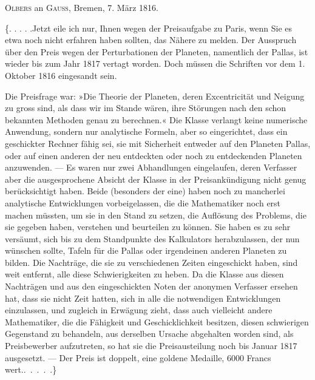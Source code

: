 \par{}\bigskip
\begin{center}
\textsc{Olbers} an \textsc{Gauss}, Bremen, 7. März 1816.
\end{center}
\noindent\hspace*{\parindent}\{. . . . .\quad Jetzt eile ich nur, Ihnen wegen der Preisaufgabe zu Paris, wenn Sie es etwa noch nicht erfahren haben sollten, das Nähere zu melden. Der Ausspruch über den Preis wegen der Perturbationen der Planeten, namentlich der Pallas, ist wieder bis zum Jahr 1817 vertagt worden. Doch müssen die Schriften vor dem 1. Oktober 1816 eingesandt sein.
\par Die Preisfrage war: »Die Theorie der Planeten, deren Excentricität und Neigung zu gross sind, als dass wir im Stande wären, ihre Störungen nach den schon bekannten Methoden genau zu berechnen.« Die Klasse verlangt keine numerische Anwendung, sondern nur analytische Formeln, aber so eingerichtet, dass ein geschickter Rechner fähig sei, sie mit Sicherheit entweder auf den Planeten Pallas, oder auf einen anderen der neu entdeckten oder noch zu entdeckenden Planeten anzuwenden. — Es waren nur zwei Abhandlungen eingelaufen, deren Verfasser aber die ausgesprochene Absicht der Klasse in der Preisankündigung nicht genug berücksichtigt haben. Beide (besonders der eine) haben noch zu mancherlei analytische Entwicklungen vorbeigelassen, die die Mathematiker noch erst machen müssten, um sie in den Stand zu setzen, die Auflösung des Problems, die sie gegeben haben, verstehen und beurteilen zu können. Sie haben es zu sehr versäumt, sich bis zu dem Standpunkte des Kalkulators herabzulassen, der nun wünschen sollte, Tafeln für die Pallas oder irgendeinen anderen Planeten zu bilden. Die Nachträge, die sie zu verschiedenen Zeiten eingeschickt haben, sind weit entfernt, alle diese Schwierigkeiten zu heben. Da die Klasse aus diesen Nachträgen und aus den eingeschickten Noten der anonymen Verfasser ersehen hat, dass sie nicht Zeit hatten, sich in alle die notwendigen Entwicklungen einzulassen, und zugleich in Erwägung zieht, dass auch vielleicht andere Mathematiker, die die Fähigkeit und Geschicklichkeit besitzen, diesen schwierigen Gegenstand zu behandeln, aus derselben Ursache abgehalten worden sind, als Preisbewerber aufzutreten, so hat sie die Preisausteilung noch bis Januar 1817 ausgesetzt. — Der Preis ist doppelt, eine goldene Medaille, 6000 Francs wert.\quad\mbox{. . . . .\}}
\par
